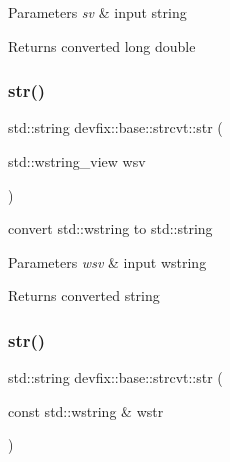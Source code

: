 \begin{DoxyParams}{Parameters}
{\em sv} & input string \\
\hline
\end{DoxyParams}
\begin{DoxyReturn}{Returns}
converted long double 
\end{DoxyReturn}
\mbox{\label{structdevfix_1_1base_1_1strcvt_a22dadaf95d340097e76fb077898578a7}} 
\subsubsection{\texorpdfstring{str()}{str()}\hspace{0.1cm}{\footnotesize\ttfamily [1/2]}}
{\footnotesize\ttfamily std\+::string devfix\+::base\+::strcvt\+::str (\begin{DoxyParamCaption}\item[{std\+::wstring\+\_\+view}]{wsv }\end{DoxyParamCaption})\hspace{0.3cm}{\ttfamily [static]}}



convert std\+::wstring to std\+::string 


\begin{DoxyParams}{Parameters}
{\em wsv} & input wstring \\
\hline
\end{DoxyParams}
\begin{DoxyReturn}{Returns}
converted string 
\end{DoxyReturn}
\mbox{\label{structdevfix_1_1base_1_1strcvt_a721e180085ba30dbdb37ac878d75d350}} 
\subsubsection{\texorpdfstring{str()}{str()}\hspace{0.1cm}{\footnotesize\ttfamily [2/2]}}
{\footnotesize\ttfamily std\+::string devfix\+::base\+::strcvt\+::str (\begin{DoxyParamCaption}\item[{const std\+::wstring \&}]{wstr }\end{DoxyParamCaption})\hspace{0.3cm}{\ttfamily [static]}}



